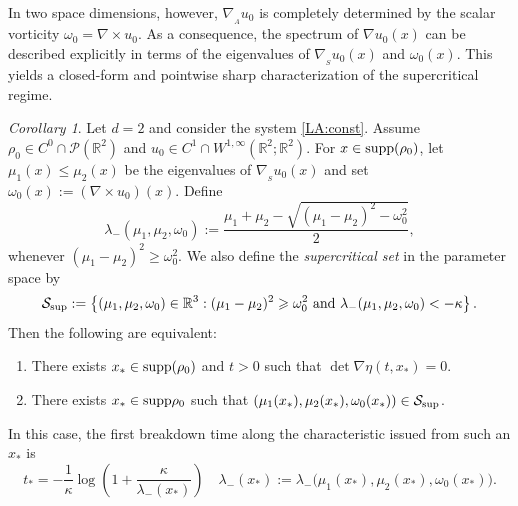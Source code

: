 \documentclass[11pt]{amsart}
\numberwithin{equation}{section}
\newtheorem{corollary}[theorem]{Corollary}
\theoremstyle{definition}
\theoremstyle{remark}
\numberwithin{equation}{section}
\newtheorem{corollary}[theorem]{Corollary}
\newcommand{\R}{\mathbb R}
\newcommand{\lt}{\left}
\newcommand{\rt}{\right}
\newcommand{\calP}{\mathcal P}
\newcommand{\calS}{\mathcal S}
\newcommand{\supp}{{\rm supp}}
\newcommand{\nabS}{\nabla_{\!\!{}_S}}
\newcommand{\nabA}{\nabla_{\!\!{}_A}}
\renewcommand{\ge}{\geqslant}
\renewcommand{\le}{\leqslant}
\begin{document}
In two space dimensions, however, $\nabA u_0$ is completely determined by the scalar vorticity $\omega_0=\nabla\times u_0$. As a consequence, the spectrum of $\nabla u_0(x)$ can be described explicitly in terms of the eigenvalues of $\nabS u_0(x)$ and $\omega_0(x)$. This yields a closed-form and pointwise sharp characterization of the supercritical regime.


\begin{corollary}\label{cor:2d_sharp}
Let $d=2$ and consider the  system \eqref{LA:const}. Assume $\rho_0\in C^0\cap\calP(\R^2)$ and $u_0\in C^1\cap W^{1,\infty}(\R^2;\R^2)$. For $x\in\supp(\rho_0)$, let $\mu_1(x)\le \mu_2(x)$ be the eigenvalues of $\nabS u_0(x)$ and set $\omega_0(x):=(\nabla\times u_0)(x)$. Define
\[
\lambda_-(\mu_1,\mu_2,\omega_0)
:=\frac{\mu_1+\mu_2-\sqrt{(\mu_1-\mu_2)^2-\omega_0^2}}{2},
\]
whenever $(\mu_1-\mu_2)^2\ge \omega_0^2$.
We also define the \emph{supercritical set} in the parameter space by
\[
\calS_{{\rm sup}}
:=\lt\{(\mu_1,\mu_2,\omega_0)\in\R^3:  
(\mu_1-\mu_2)^2\ge \omega_0^2  \text{ and } 
\lambda_-(\mu_1,\mu_2,\omega_0)<-\kappa\rt\}.
\]
Then the following are equivalent:
\begin{enumerate}
\item[\rm (i)] There exists $x_* \in \supp(\rho_0)$ and $t>0$ such that $\det\nabla\eta(t,x_*)=0$.
\item[\rm (ii)] There exists $x_*\in\supp\rho_0$ such that $(\mu_1(x_*),\mu_2(x_*),\omega_0(x_*))\in \calS_{{\rm sup}}$.
\end{enumerate}
In this case, the first breakdown time along the characteristic issued from such an $x_*$ is
\[
t_*=-\frac1\kappa\log\lt(1+\frac{\kappa}{\lambda_-(x_*)}\rt)\quad
\lambda_-(x_*):=\lambda_-\big(\mu_1(x_*),\mu_2(x_*),\omega_0(x_*)\big).
\]
\end{corollary}
 
\end{document}
